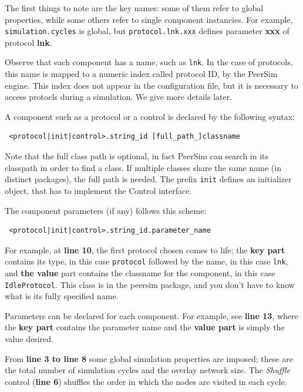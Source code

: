 \documentclass[a4paper,11pt]{article}
\begin{document}
The first things to note are the
key names: some of them refer to global properties, while some
others refer to single component instancies. For example,
\texttt{simulation.cycles} is global, but \texttt{protocol.lnk.xxx}
defines parameter \textbf{xxx} of protocol \textbf{lnk}.

Observe that each component has a name,
such as \texttt{lnk}. In the case of protocols, this
name is mapped to a numeric index called protocol ID, by the PeerSim
engine.
This index does not appear in the configuration file, but it is necessary
to access protocls during a simulation.
We give more details later.

A component such as a protocol or a control is declared by  the
following syntax:

\begin{verbatim} <protocol|init|control>.string_id [full_path_]classname
\end{verbatim}

Note that the full class path is optional, in fact PeerSim can search
in its classpath in order to find a class. If multiple classes share
the same name (in distinct packages), the full path is needed.
The prefix {\tt init} defines an initializer object, that has to implement
the Control interface.
  
The component parameters (if any) follows this scheme:

\begin{verbatim} <protocol|init|control>.string_id.parameter_name
\end{verbatim}

For example, at \textbf{line 10}, the first protocol chosen comes to life;
the \textbf{key part} contains its type, in this case {\tt protocol}
followed by the name, in this case {\tt lnk}, and \textbf{the
value} part contains the classname for the component, in this case
{\tt IdleProtocol}.
This class is in the peersim package, and you don't have to know what is
its fully specified name.

Parameters can be declared for each component.
For example, see \textbf{line 13}, where the \textbf{key part} contains the
parameter name and the \textbf{value part} is simply the value desired.

From \textbf{line 3 to line 8}
some global simulation properties are imposed; these are the total
number of simulation cycles and the overlay network size. The
\emph{Shuffle} control (\textbf{line 6}) shuffles the order in which the nodes
are visited in each cycle. 
\end{document}
